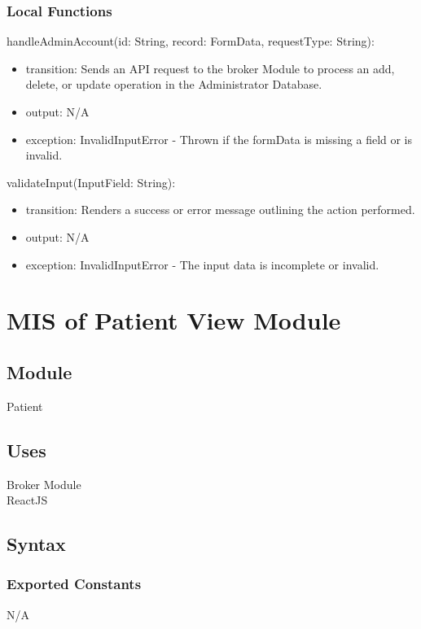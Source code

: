 \documentclass[12pt, titlepage]{article}
\begin{document}
\subsubsection{Local Functions}

\noindent handleAdminAccount(id: String, record: FormData, requestType: String):
\begin{itemize}
\item transition: Sends an API request to the broker Module to process an add, delete, or update operation in the Administrator Database.
\item output: N/A
\item exception: InvalidInputError - Thrown if the formData is missing a field or is invalid.
\end{itemize} 

\noindent validateInput(InputField: String):
\begin{itemize}
\item transition: Renders a success or error message outlining the action performed.
\item output: N/A
\item exception: InvalidInputError - The input data is incomplete or invalid.
\end{itemize}

\newpage

\section{MIS of Patient View Module} \label{Module_PatientView}

\subsection{Module}
Patient

\subsection{Uses}
Broker Module \\
ReactJS\\

\subsection{Syntax}

\subsubsection{Exported Constants}
N/A
\end{document}

